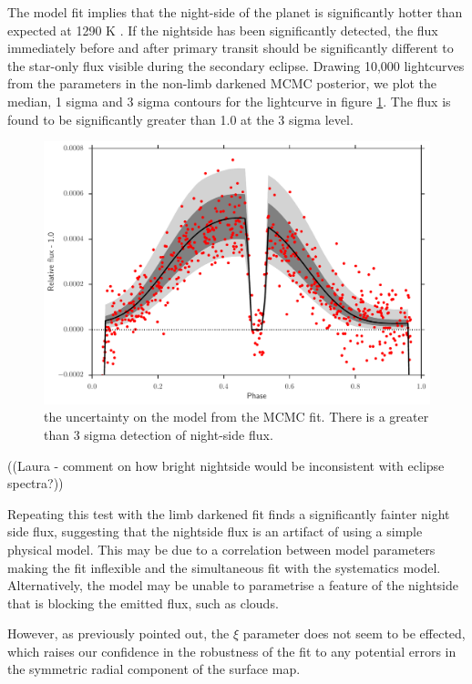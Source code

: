 \documentclass[a4paper,fleqn,usenatbib]{mnras}
\begin{document}
The model fit implies that the night-side of the planet is significantly hotter than expected at 1290 K \citet{Stevenson2014}. If the nightside has been significantly detected, the flux immediately before and after primary transit should be significantly different to the star-only flux visible during the secondary eclipse. Drawing 10,000 lightcurves from the parameters in the non-limb darkened MCMC posterior, we plot the median, 1 sigma and 3 sigma contours for the lightcurve in figure \ref{fig:model}. The flux is found to be significantly greater than 1.0 at the 3 sigma level.

\begin{figure}
\begin{center}
\includegraphics[width=\columnwidth]{img/model.pdf}
\caption{the uncertainty on the model from the MCMC fit. There is a greater than 3 sigma detection of night-side flux.}
\label{fig:model}
\end{center}
\end{figure}

((Laura - comment on how bright nightside would be inconsistent with eclipse spectra?))

Repeating this test with the limb darkened fit finds a significantly fainter night side flux, suggesting that the nightside flux is an artifact of using a simple physical model. This may be due to a correlation between model parameters making the fit inflexible and the simultaneous fit with the systematics model. Alternatively, the model may be unable to parametrise a feature of the nightside that is blocking the emitted flux, such as clouds.

However, as previously pointed out, the $\xi$ parameter does not seem to be effected, which raises our confidence in the robustness of the fit to any potential errors in the symmetric radial component of the surface map.
\end{document}

